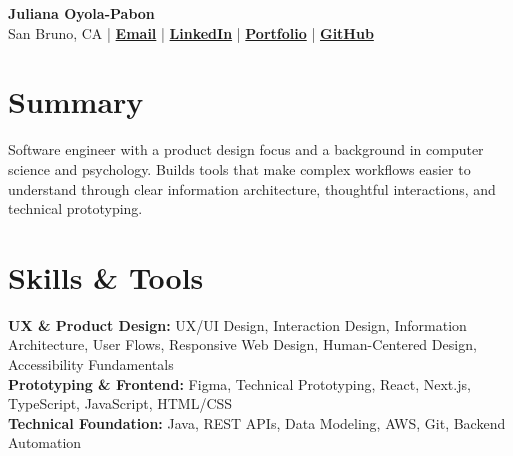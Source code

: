 \documentclass[10pt,letterpaper]{article}
\begin{document}
\begin{center}
{\LARGE\bfseries\color{Accent} Juliana Oyola-Pabon}\\[4pt]
San Bruno, CA
\;|\;
\href{mailto:julianaaoyola@gmail.com}{\textbf{Email}}
\;|\;
\href{https://linkedin.com/in/julianaoyola}{\textbf{LinkedIn}}
\;|\;
\href{https://juliana-portfolio-two.vercel.app/}{\textbf{Portfolio}}
\;|\;
\href{https://github.com/julsoyola}{\textbf{GitHub}}
\end{center}

\vspace{-2pt}
\section*{Summary}
Software engineer with a product design focus and a background in computer science and psychology. Builds tools that make complex workflows easier to understand through clear information architecture, thoughtful interactions, and technical prototyping.

\section*{Skills \& Tools}
\textbf{UX \& Product Design:} UX/UI Design, Interaction Design, Information Architecture, User Flows, Responsive Web Design, Human-Centered Design, Accessibility Fundamentals \\
\textbf{Prototyping \& Frontend:} Figma, Technical Prototyping, React, Next.js, TypeScript, JavaScript, HTML/CSS \\
\textbf{Technical Foundation:} Java, REST APIs, Data Modeling, AWS, Git, Backend Automation
\end{document}
